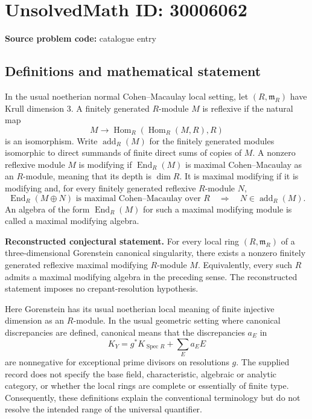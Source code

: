 \documentclass[11pt]{article}
\begin{document}
\section*{UnsolvedMath ID: 30006062}
\textbf{Source problem code:} catalogue entry
\subsection{Definitions and mathematical statement}
In the usual noetherian normal Cohen--Macaulay local setting, let \((R,\mathfrak m_R)\) have Krull dimension \(3\). A finitely generated \(R\)-module \(M\) is reflexive if the natural map
\[
M\longrightarrow \operatorname{Hom}_R(\operatorname{Hom}_R(M,R),R)
\]
is an isomorphism. Write \(\operatorname{add}_R(M)\) for the finitely generated modules isomorphic to direct summands of finite direct sums of copies of \(M\). A nonzero reflexive module \(M\) is modifying if \(\operatorname{End}_R(M)\) is maximal Cohen--Macaulay as an \(R\)-module, meaning that its depth is \(\dim R\). It is maximal modifying if it is modifying and, for every finitely generated reflexive \(R\)-module \(N\),
\[
\operatorname{End}_R(M\oplus N)\text{ is maximal Cohen--Macaulay over }R
\quad\Longrightarrow\quad
N\in\operatorname{add}_R(M).
\]
An algebra of the form \(\operatorname{End}_R(M)\) for such a maximal modifying module is called a maximal modifying algebra.

\textbf{Reconstructed conjectural statement.} For every local ring \((R,\mathfrak m_R)\) of a three-dimensional Gorenstein canonical singularity, there exists a nonzero finitely generated reflexive maximal modifying \(R\)-module \(M\). Equivalently, every such \(R\) admits a maximal modifying algebra in the preceding sense. The reconstructed statement imposes no crepant-resolution hypothesis.

Here Gorenstein has its usual noetherian local meaning of finite injective dimension as an \(R\)-module. In the usual geometric setting where canonical discrepancies are defined, canonical means that the discrepancies \(a_E\) in
\[
K_Y=g^*K_{\operatorname{Spec}R}+\sum_E a_E E
\]
are nonnegative for exceptional prime divisors on resolutions \(g\). The supplied record does not specify the base field, characteristic, algebraic or analytic category, or whether the local rings are complete or essentially of finite type. Consequently, these definitions explain the conventional terminology but do not resolve the intended range of the universal quantifier.
\end{document}
